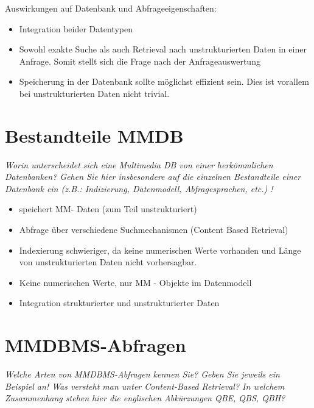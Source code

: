 \documentclass{article}
\begin{document}
	Auswirkungen auf Datenbank und Abfrageeigenschaften:
	\begin{itemize}
		\item Integration beider Datentypen
		\item Sowohl exakte Suche als auch Retrieval nach unstrukturierten Daten in einer Anfrage. Somit stellt sich die Frage nach der Anfrageauswertung
		\item Speicherung in der Datenbank sollte möglichst effizient sein. Dies ist vorallem bei unstrukturierten Daten nicht trivial.
	\end{itemize}

\section{Bestandteile MMDB}
\textit{Worin unterscheidet sich eine Multimedia DB von einer herkömmlichen Datenbanken? Gehen Sie hier insbesondere auf die einzelnen Bestandteile einer Datenbank ein (z.B.: Indizierung, Datenmodell, Abfragesprachen, etc.) !}

\begin{itemize}
	\item speichert MM- Daten (zum Teil unstrukturiert)
	\item Abfrage über verschiedene Suchmechanismen (Content Based Retrieval)
	\item Indexierung schwieriger, da keine numerischen Werte vorhanden und Länge von unstrukturierten Daten nicht vorhersagbar.
	\item Keine numerischen Werte, nur MM - Objekte im Datenmodell
	\item Integration strukturierter und unstrukturierter Daten
\end{itemize}


\section{MMDBMS-Abfragen}

\textit{Welche Arten von MMDBMS-Abfragen kennen Sie? Geben Sie jeweils ein Beispiel an! Was versteht man unter Content-Based Retrieval? In welchem Zusammenhang stehen hier die englischen Abkürzungen QBE, QBS, QBH?}
\end{document}
